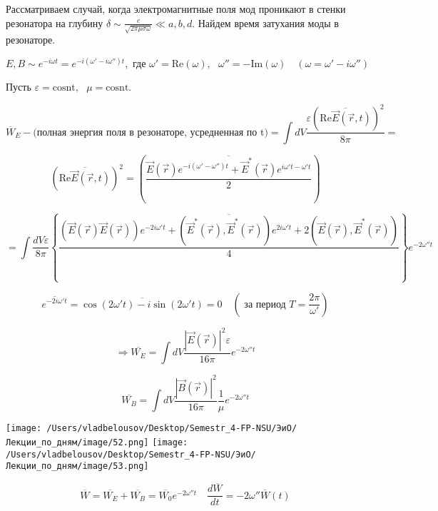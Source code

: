 \documentclass[12pt, a4paper]{report}
\begin{document}
Рассматриваем случай, когда электромагнитные поля мод проникают в стенки резонатора на глубину \(\displaystyle  \delta \sim \frac{c }{\sqrt{2 \pi \mu \sigma \omega}} \ll a, b,d  \). Найдем время затухания моды в резонаторе. 

\[ E,B \sim e ^{-i \omega t } = e^{ - i (\omega ' - i\omega '')t} , \text{ где } \omega' = \mathrm{Re} (\omega) , \text{ } \omega'' =-\mathrm{Im} (\omega)  \quad (\omega =\omega ' - i \omega'')   \] 

Пусть \( \varepsilon = \mathrm{cosnt}, \text{ }  \mu = \mathrm{cosnt}.   \) 

\[ \overline{W}_E - \text{(полная энергия поля в резонаторе, усредненная по t)} = \int dV \frac{\varepsilon (\overline{\mathrm{Re}\vec{E} (\vec{r } ,t ) }  ) ^2 }{8 \pi}  \boxed{=}  \] 

\[(\overline{\mathrm{Re}\vec{E} (\vec{r } ,t ) }  ) ^2 = \left( \overline{\frac{\vec{E }  (\vec{r } ) e^{- i (\omega ' - \omega '')t} + \vec{E } ^{* }  (\vec{r } ) e ^{ i \omega ' t - \omega ' t} }{2} }   \right)  \] 

\[ \boxed{= } \int  \frac{dV \varepsilon}{8 \pi}  \left\{\overline{ \frac{(\vec{E } (\vec{r }) \vec{E } (\vec{r } ) ) e^{- 2 i \omega 't } + (\vec{E } ^{* } (\vec{r } ), \vec{E } ^{* } (\vec{r } )) e ^{ 2 i \omega ' t} + 2 (\vec{E } (\vec{r } ), \vec{E} ^{* } (\vec{r } )) }{4} }   \right\} e^{- 2 \omega ''t }  \] 

\[ \overline{e ^{ -2 i \omega ' t } }  =\overline{\cos (2 \omega ' t)- i \sin (2 \omega ' t)} = 0 \quad (\text{ за период } T =\frac{ 2\pi}{\omega'} )     \] 

\[ \Rightarrow \overline{W_E} = \int dV \frac{\left\lvert \vec{E } (\vec{r } ) \right\rvert ^2 \varepsilon}{1 6\pi } e^{- 2 \omega '' t}     \] 

\[ \overline{W_B} = \int dV \frac{\left\lvert \vec{B } (\vec{r } ) \right\rvert ^2}{1 6\pi }\frac{1}{\mu}  e^{- 2 \omega '' t}    \] 


\begin{center}
    \texttt{[image: /Users/vladbelousov/Desktop/Semestr\_4-FP-NSU/ЭиО/Лекции\_по\_дням/image/52.png]}
    \texttt{[image: /Users/vladbelousov/Desktop/Semestr\_4-FP-NSU/ЭиО/Лекции\_по\_дням/image/53.png]}
\end{center}

\[ \overline{W }  = \overline{W_E} + \overline{W_B}  = \overline{W_0 } e^{ - 2 \omega '' t}  \quad  \frac{d \overline{ W}  }{dt } = - 2 \omega '' \overline{W }(t)  \] 
\end{document}
